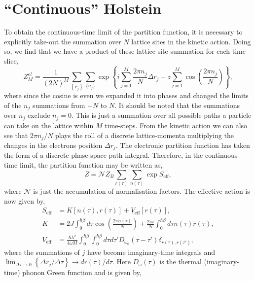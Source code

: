 \section{``Continuous'' Holstein}

To obtain the continuous-time limit of the partition function, it is necessary to explicitly take-out the summation over $N$ lattice sites in the kinetic action. Doing so, we find that we have a product of these lattice-site summation for each time-slice,
\begin{equation}
    Z^{el}_M = \frac{1}{(2N)^M} \sum_{\left\{r_j\right\}} \sum_{\{n_j\}} \exp\left\{i \sum_{j=1}^M \frac{2 \pi n_j}{N} \Delta r_j - z \sum_{j=1}^M \cos(\frac{2 \pi n_j}{N})\right\} ,
\end{equation}
where since the cosine is even we expanded it into phases and changed the limits of the $n_j$ summations from $-N$ to $N$. It should be noted that the summations over $n_j$ exclude $n_j = 0$. This is just a summation over all possible paths a particle can take on the lattice within $M$ time-steps. From the kinetic action we can also see that $2\pi n_j / N$ plays the roll of a discrete lattice-momenta multiplying the changes in the electrons position $\Delta r_j$. The electronic partition function has taken the form of a discrete phase-space path integral. Therefore, in the continuous-time limit, the partition function may be written as,
\begin{equation}
    Z = \mathcal{N} Z_B \sum_{r(\tau)} \sum_{n(\tau)} \exp{S_{\text{eff}}} ,
\end{equation}
where $\mathcal{N}$ is just the accumulation of normalisation factors. The effective action is now given by,
\begin{equation}
    \begin{aligned}
        S_{\text{eff}} &= K[n(\tau), r(\tau)] + V_{\text{eff}}[r(\tau)] , \\
        K &= 2J \int_0^{\hbar\beta} d\tau \cos{\left(\frac{2\pi n(\tau)}{N}\right)} + \frac{2\pi i}{N} \int_0^{\hbar\beta} d\tau n(\tau) \Dot{r}(\tau) , \\
        V_{\text{eff}} &= \frac{\hbar \lambda^2}{4 \omega M} \int_0^{\hbar\beta} \int_0^{\hbar\beta} d\tau d\tau' D_{\omega_0}(\tau - \tau') \delta_{r(\tau), r(\tau')} ,
    \end{aligned}
\end{equation}
where the summations of $j$ have become imaginary-time integrals and $\lim_{\Delta\tau \to 0} \left\{\Delta r_j / \Delta \tau\right\} \rightarrow d r(\tau) / d\tau$. Here $D_{\omega}(\tau)$ is the thermal (imaginary-time) phonon Green function  and is given by,
